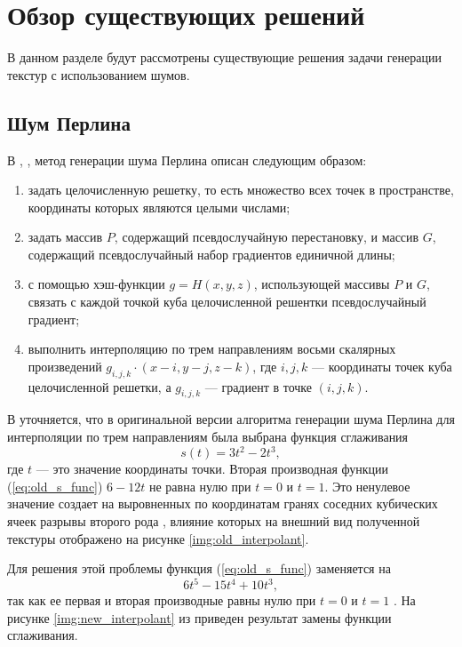 \chapter{Обзор существующих решений}

В данном разделе будут рассмотрены существующие решения задачи генерации текстур с использованием шумов.

\section{Шум Перлина}

В \cite{tandm}, \cite{perlin}, \cite{impperlin} метод генерации шума Перлина описан следующим образом:
\begin{enumerate}
	\item задать целочисленную решетку, то есть множество всех точек в пространстве, координаты которых являются целыми числами;
	\item задать массив $P$, содержащий псевдослучайную перестановку, и массив $G$, содержащий псевдослучайный набор градиентов единичной длины;
	\item с помощью хэш-функции $g = H(x, y, z)$, использующей массивы $P$ и $G$, связать с каждой точкой куба целочисленной решентки псевдослучайный градиент;
	\item выполнить интерполяцию по трем направлениям восьми скалярных произведений $g_{i, j, k} \cdot (x - i, y - j, z - k)$, где $i, j, k$  --- координаты точек куба целочисленной решетки, а $g_{i, j, k}$ --- градиент в точке $(i, j, k)$.
\end{enumerate}

В \cite{impperlin} уточняется, что в оригинальной версии алгоритма генерации шума Перлина для интерполяции по трем направлениям была выбрана функция сглаживания
\begin{equation}
	\label{eq:old_s_func}
	s(t) = 3t^2 - 2t^3,
\end{equation}
где $t$ --- это значение координаты точки. Вторая производная функции (\ref{eq:old_s_func}) $6 - 12t$ не равна нулю при $t = 0$ и $t = 1$. 
Это ненулевое значение создает на выровненных по координатам гранях соседних кубических ячеек разрывы второго рода  \cite{impperlin}, влияние которых на внешний вид полученной текстуры отображено на рисунке \ref{img:old_interpolant}.

Для решения этой проблемы функция (\ref{eq:old_s_func}) заменяется на
\begin{equation}
	\label{eq:new_s_func}
	6t^5 - 15t^4 + 10t^3,
\end{equation}
так как ее первая и вторая производные равны нулю при $t = 0$ и $t = 1$ \cite{impperlin}. 
На рисунке \ref{img:new_interpolant} из \cite{impperlin} приведен результат замены функции сглаживания.


